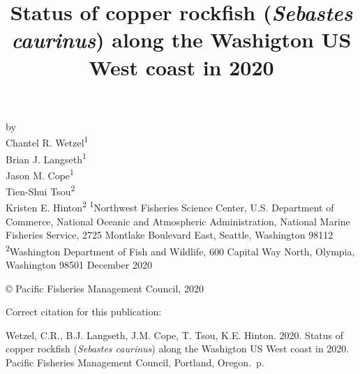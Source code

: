 \documentclass[11pt,
  english,
  a4paper,
]{article}
\date{}
\newcommand{\trTitle}{Status of copper rockfish (\emph{Sebastes caurinus}) along the Washigton US West coast in 2020}
\newcommand{\trYear}{2020}
\newcommand{\trMonth}{December}
\newcommand{\trAuthsBack}{Wetzel, C.R., B.J. Langseth, J.M. Cope, T. Tsou, K.E. Hinton}
\newcommand{\trCitation}{
\begin{hangparas}{1em}{1}
\trAuthsBack{}. \trYear{}. \trTitle{}. Pacific Fisheries Management Council, Portland, Oregon. \pageref{LastPage}{}\,p.
\end{hangparas}}
\begin{document}

\renewcommand*{\thefootnote}{\fnsymbol{footnote}}

\small
\thispagestyle{empty}
\noindent
\begin{center}
\title{Status of copper rockfish (\emph{Sebastes caurinus}) along the Washigton US West coast in 2020}
\vspace{1.5cm}
{\Large\textbf{}}
\vfill
by\\
Chantel R. Wetzel\textsuperscript{1}\\
Brian J. Langseth\textsuperscript{1}\\
Jason M. Cope\textsuperscript{1}\\
Tien-Shui Tsou\textsuperscript{2}\\
Kristen E. Hinton\textsuperscript{2}\vfill
\textsuperscript{1}Northwest Fisheries Science Center, U.S. Department of Commerce, National Oceanic and Atmospheric Administration, National Marine Fisheries Service, 2725 Montlake Boulevard East, Seattle, Washington 98112\\
\textsuperscript{2}Washington Department of Fish and Wildlife, 600 Capital Way North, Olympia, Washington 98501\vfill
\trMonth{} \trYear{}
\end{center}
\clearpage

\thispagestyle{empty}
\vspace*{\fill}
\begin{center}
\copyright{} Pacific Fisheries Management Council, \trYear{}\\
\end{center}
\par
\bigskip
\noindent
Correct citation for this publication:
\bigskip
\par
\trCitation{}
\clearpage


\tableofcontents\clearpage
\listoffigures \listoftables \clearpage
\label{TRlastRoman}
\clearpage

\newpage
\thispagestyle{empty} %

\pagestyle{plain}  %
\renewcommand*{\thefootnote}{\arabic{footnote}}  %
\setcounter{footnote}{0}  %
\renewcommand{\headrulewidth}{0.5pt}
\renewcommand{\footrulewidth}{0.5pt}
\end{document}
